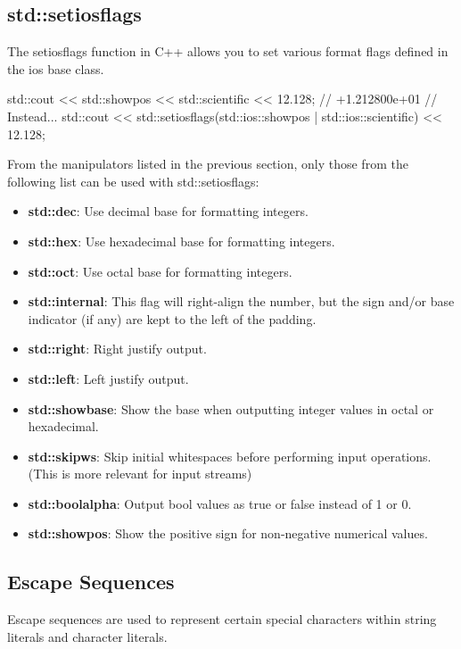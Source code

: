 \documentclass{report}
\begin{document}
    \pagebreak
    \subsection{std::setiosflags}
    The setiosflags function in C++ allows you to set various format flags defined in the ios base class. 
    \bigbreak \noindent 
    
    \begin{cppcode}
    std::cout << std::showpos << std::scientific << 12.128; // +1.212800e+01
    // Instead...
    std::cout << std::setiosflags(std::ios::showpos | std::ios::scientific) << 12.128; 
    \end{cppcode}
    
    \bigbreak \noindent 
    From the manipulators listed in the previous section, only those from the following list can be used with std::setiosflags:
    \begin{itemize}
        \item \textbf{std::dec}: Use decimal base for formatting integers.
        \item \textbf{std::hex}: Use hexadecimal base for formatting integers.
        \item \textbf{std::oct}: Use octal base for formatting integers.
        \item \textbf{std::internal}: This flag will right-align the number, but the sign and/or base indicator (if any) are kept to the left of the padding.
        \item \textbf{std::right}: Right justify output.
        \item \textbf{std::left}: Left justify output.
        \item \textbf{std::showbase}: Show the base when outputting integer values in octal or hexadecimal.
        \item \textbf{std::skipws}: Skip initial whitespaces before performing input operations. (This is more relevant for input streams)
        \item \textbf{std::boolalpha}: Output bool values as true or false instead of 1 or 0.
        \item \textbf{std::showpos}: Show the positive sign for non-negative numerical values.
    \end{itemize}

    \bigbreak \noindent 
    \subsection{Escape Sequences}
    \bigbreak \noindent 
    Escape sequences are used to represent certain special characters within string literals and character literals.
    \bigbreak \noindent 
\end{document}
